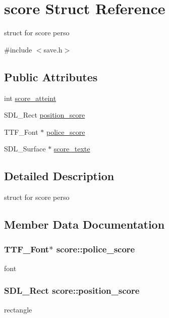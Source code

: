 \hypertarget{structscore}{}\section{score Struct Reference}
\label{structscore}


struct for score perso  




{\ttfamily \#include $<$save.\+h$>$}

\subsection*{Public Attributes}
\begin{DoxyCompactItemize}
\item 
int \hyperlink{structscore_a86ee1f22a5bf4e92781f2b2165aa0859}{score\+\_\+atteint}
\item 
S\+D\+L\+\_\+\+Rect \hyperlink{structscore_a444e826e64d1abf14dc0108095752cc1}{position\+\_\+score}
\item 
T\+T\+F\+\_\+\+Font $\ast$ \hyperlink{structscore_aa8088c00f0a0ce91db39deb03afc7110}{police\+\_\+score}
\item 
S\+D\+L\+\_\+\+Surface $\ast$ \hyperlink{structscore_aa5918332d1797da4bedaccfce5446b88}{score\+\_\+texte}
\end{DoxyCompactItemize}


\subsection{Detailed Description}
struct for score perso 

\subsection{Member Data Documentation}
\subsubsection[{\texorpdfstring{police\+\_\+score}{police_score}}]{\setlength{\rightskip}{0pt plus 5cm}T\+T\+F\+\_\+\+Font$\ast$ score\+::police\+\_\+score}\hypertarget{structscore_aa8088c00f0a0ce91db39deb03afc7110}{}\label{structscore_aa8088c00f0a0ce91db39deb03afc7110}
font 
\subsubsection[{\texorpdfstring{position\+\_\+score}{position_score}}]{\setlength{\rightskip}{0pt plus 5cm}S\+D\+L\+\_\+\+Rect score\+::position\+\_\+score}\hypertarget{structscore_a444e826e64d1abf14dc0108095752cc1}{}\label{structscore_a444e826e64d1abf14dc0108095752cc1}
rectangle 
